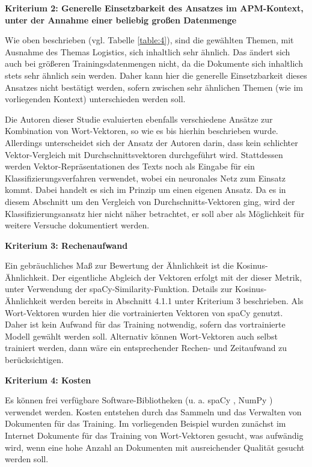 {\bf Kriterium 2: Generelle Einsetzbarkeit des Ansatzes im APM-Kontext, unter der Annahme einer beliebig großen Datenmenge}

Wie oben beschrieben (vgl. Tabelle \ref{table:4}), sind die gewählten Themen, mit Ausnahme des Themas Logistics, sich inhaltlich sehr ähnlich. Das ändert sich auch bei größeren Trainingsdatenmengen nicht, da die Dokumente sich inhaltlich stets sehr ähnlich sein werden. Daher kann hier die generelle Einsetzbarkeit dieses Ansatzes nicht bestätigt werden, sofern zwischen sehr ähnlichen Themen (wie im vorliegenden Kontext) unterschieden werden soll.

Die Autoren dieser Studie \cite{dilawar} evaluierten ebenfalls verschiedene Ansätze zur Kombination von Wort-Vektoren, so wie es bis hierhin beschrieben wurde. Allerdings unterscheidet sich der Ansatz der Autoren darin, dass kein schlichter Vektor-Vergleich mit Durchschnittsvektoren durchgeführt wird. Stattdessen werden Vektor-Repräsentationen des Texts noch als Eingabe für ein Klassifizierungsverfahren verwendet, wobei ein neuronales Netz zum Einsatz kommt. Dabei handelt es sich im Prinzip um einen eigenen Ansatz. Da es in diesem Abschnitt um den Vergleich von Durchschnitts-Vektoren ging, wird der Klassifizierungsansatz hier nicht näher betrachtet, er soll aber als Möglichkeit für weitere Versuche dokumentiert werden.


{\bf Kriterium 3: Rechenaufwand}

Ein gebräuchliches Maß zur Bewertung der Ähnlichkeit ist die Kosinus-Ähnlichkeit. Der eigentliche Abgleich der Vektoren erfolgt mit der dieser Metrik, unter Verwendung der spaCy-Similarity-Funktion. Details zur Kosinus-Ähnlichkeit werden bereits in Abschnitt 4.1.1 unter Kriterium 3 beschrieben. Als Wort-Vektoren wurden hier die vortrainierten Vektoren von spaCy genutzt. Daher ist kein Aufwand für das Training notwendig, sofern das vortrainierte Modell gewählt werden soll. Alternativ können Wort-Vektoren auch selbst trainiert werden, dann wäre ein entsprechender Rechen- und Zeitaufwand zu berücksichtigen.

{\bf Kriterium 4: Kosten}

Es können frei verfügbare Software-Bibliotheken (u. a. spaCy \cite{spacy-license}, NumPy \cite{numpy-license}) verwendet werden. Kosten entstehen durch das Sammeln und das Verwalten von Dokumenten für das Training. Im vorliegenden Beispiel wurden zunächst im Internet Dokumente für das Training von Wort-Vektoren gesucht, was aufwändig wird, wenn eine hohe Anzahl an Dokumenten mit ausreichender Qualität gesucht werden soll.

